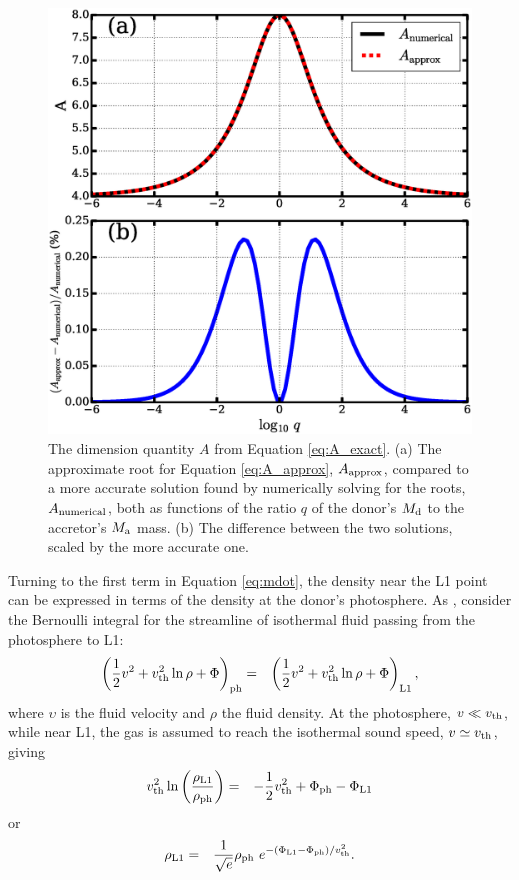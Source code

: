 \documentclass{aastex}
\newcommand{\be}{\begin{eqnarray}}
\newcommand{\ee}{\end{eqnarray}}
\begin{document}
\begin{figure}[h]
\includegraphics[width=\textwidth]{coeff_A}
\caption{The dimension quantity $A$ from Equation \ref{eq:A_exact}. (a) The approximate root for Equation \ref{eq:A_approx}, $A_{\rm approx}$, compared to a more accurate solution found by numerically solving for the roots, $A_{\rm numerical}$, both as functions of the ratio $q$ of the donor's $M_{\rm d}$ to the accretor's $M_{\rm a}$ mass. (b) The difference between the two solutions, scaled by the more accurate one.}
\label{fig:coeff_A}
\end{figure}

Turning to the first term in Equation \ref{eq:mdot}, the density near the L1 point can be expressed in terms of the density at the donor's photosphere. As \citet{1988A&A...202...93R}, consider the Bernoulli integral for the streamline of isothermal fluid passing from the photosphere to L1:
\be
\left( \frac{1}{2} v^2 + v_{\rm th}^2 \ln \rho + \Phi  \right)_{\rm ph} & = & \left( \frac{1}{2}v^2  + v_{\rm th}^2 \ln \rho + \Phi \right)_{\rm L1}, 
\ee
where $\upsilon$ is the fluid velocity and $\rho$ the fluid density. At the photosphere, $v \ll v_{\rm th}$, while near L1, the gas is assumed to reach the isothermal sound speed, $v \simeq v_{\rm th} $, giving
\be
v_{\rm th}^2 \ln \left( \frac{\rho_{\rm L1}}{\rho_{\rm ph}} \right) & = & - \frac{1}{2} v_{\rm th}^2 + \Phi_{\rm ph} - \Phi_{\rm L1}
\ee
or
\be
\rho_{\rm L1} & = & \frac{1}{\sqrt{e}} \rho_{\rm ph}\ e^{-(\Phi_{\rm L1}-\Phi_{\rm ph})/v_{\rm th}^2}.
\label{eq:rhoL1}
\ee
\end{document}
